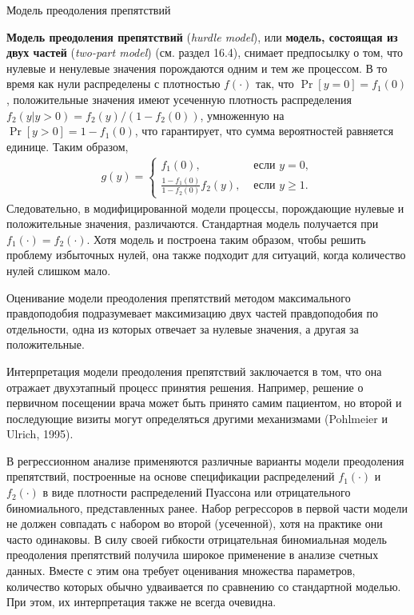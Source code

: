         \begin{center}{Модель преодоления препятствий}\end{center} %
\noindent
\textbf{Модель преодоления препятствий} (\textit{hurdle model}), или \textbf{модель, состоящая из двух частей} (\textit{two-part model}) (см. раздел 16.4), снимает %
предпосылку о том, что нулевые и ненулевые значения порождаются одним и тем же процессом.
В то время как нули распределены с плотностью $f(\cdot)$ так, что $\Pr[y = 0] = f_1(0)$, положительные значения имеют усеченную плотность распределения $f_2(y|y > 0) = f_2(y) / (1 - f_2(0))$, умноженную на $\Pr[y > 0] = 1 - f_1(0)$, что гарантирует, что сумма вероятностей равняется единице. Таким образом,
    \begin{align}\label{eq:20.18}
    g(y) =\begin{cases}
                f_1(0),                                     & \text{ если }y = 0, \\
                \frac{1 - f_1(0)}{1 - f_2(0)} f_2(y),       & \text{ если }y \ge 1.
                \end{cases}
    \end{align}
Следовательно, в модифицированной модели процессы, порождающие нулевые и положительные значения, различаются. Стандартная модель получается при $f_1(\cdot) = f_2(\cdot)$. Хотя модель и построена таким образом, чтобы решить проблему избыточных нулей, она также подходит для ситуаций, когда количество нулей слишком мало.

Оценивание модели преодоления препятствий методом максимального правдоподобия подразумевает максимизацию двух частей правдоподобия по отдельности, одна из которых отвечает за нулевые значения, а другая за положительные.

Интерпретация модели преодоления препятствий заключается в том, что она отражает двухэтапный процесс принятия решения. Например, решение о первичном посещении врача может быть принято самим пациентом, но второй и последующие визиты могут определяться другими механизмами (Pohlmeier и Ulrich, 1995).

В регрессионном анализе применяются различные варианты модели преодоления препятствий, построенные на основе спецификации распределений $f_1(\cdot)$ и $f_2(\cdot)$ в виде плотности распределений Пуассона или отрицательного биномиального, представленных ранее. Набор регрессоров в первой части модели не должен совпадать с набором во второй (усеченной), хотя на практике они часто одинаковы. В силу своей гибкости отрицательная биномиальная модель преодоления препятствий получила широкое применение в анализе счетных данных. Вместе с этим она требует оценивания множества параметров, количество которых обычно удваивается по сравнению со стандартной моделью. При этом, их интерпретация также не всегда очевидна.

